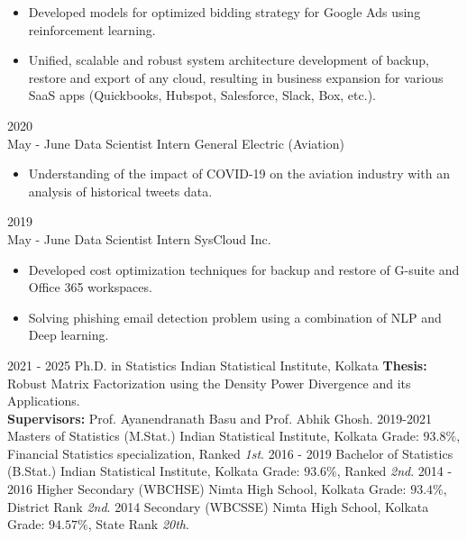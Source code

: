 \documentclass[10pt]{developercv} %
\begin{document}
\begin{entrylist}
{        \begin{itemize}[noitemsep,topsep=0pt,parsep=0pt,partopsep=0pt, leftmargin=10pt]
            \item Developed models for optimized bidding strategy for Google Ads using reinforcement learning.
            \item Unified, scalable and robust system architecture development of backup, restore and export of any cloud, resulting in business expansion for various SaaS apps (Quickbooks, Hubspot, Salesforce, Slack, Box, etc.).
        \end{itemize}
    }
    \entry
    {2020\\\footnotesize{May - June}}
    {Data Scientist Intern}
    {General Electric (Aviation)}
    {\vspace{-7pt}\small
        \begin{itemize}[noitemsep,topsep=0pt,parsep=0pt,partopsep=0pt, leftmargin=10pt]
            \item Understanding of the impact of COVID-19 on the aviation industry with an analysis of historical tweets data.
        \end{itemize}
    }
    \entry
    {2019\\\footnotesize{May - June}}
    {Data Scientist Intern}
    {SysCloud Inc.}
    {\vspace{-7pt}
    \small
        \begin{itemize}[noitemsep,topsep=0pt,parsep=0pt,partopsep=0pt, leftmargin=10pt]
            \item Developed cost optimization techniques for backup and restore of G-suite and Office 365 workspaces.
            \item Solving phishing email detection problem using a combination of NLP and Deep learning.
        \end{itemize}
    }
\end{entrylist}


\begin{entrylist}
    \entry
    {2021 - 2025}
    {Ph.D. in Statistics}
    {Indian Statistical Institute, Kolkata}
    {\textbf{Thesis:} Robust Matrix Factorization using the Density Power Divergence and its Applications. \\
    \textbf{Supervisors:} Prof. Ayanendranath Basu and Prof. Abhik Ghosh.}
    \entry
    {2019-2021}
    {Masters of Statistics (M.Stat.)}
    {Indian Statistical Institute, Kolkata}
    {Grade: $93.8\%$, Financial Statistics specialization, Ranked \emph{1st}.}
    \entry
    {2016 - 2019}
    {Bachelor of Statistics (B.Stat.)}
    {Indian Statistical Institute, Kolkata}
    {Grade: $93.6\%$, Ranked \emph{2nd}.}
    \entry
    {2014 - 2016}
    {Higher Secondary (WBCHSE)}
    {Nimta High School, Kolkata}
    {Grade: $93.4\%$, District Rank \emph{2nd}.}
    \entry
    {2014}
    {Secondary (WBCSSE)}
    {Nimta High School, Kolkata}
    {Grade: $94.57\%$, State Rank \emph{20th}.}
\end{entrylist}
\end{document}
